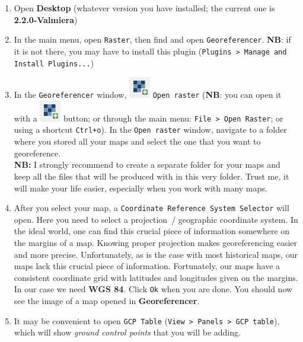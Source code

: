 \documentclass[12pt,oneside]{article}
\begin{document}
\begin{enumerate}

\item Open \QGIS \textbf{Desktop} (whatever version you have installed; the current one is \QGIS \textbf{2.2.0-Valmiera})

\item In the main menu, open \texttt{Raster}, then find and open \texttt{Georeferencer}. \textbf{NB}: if it is not there, you may have to install this plugin (\texttt{Plugins > Manage and Install Plugins...})

\item In the \texttt{Georeferencer} window, \includegraphics[scale=.5]{qgis_g_openraster} \texttt{Open raster} (\textbf{NB}: you can open it with a \includegraphics[scale=.5]{qgis_g_openraster} button; or through the main menu: \texttt{File > Open Raster}; or using a shortcut \texttt{Ctrl+o}). In the \texttt{Open raster} window, navigate to a folder where you stored all your maps and select the one that you want to georeference.\\
\textbf{NB:} I strongly recommend to create a separate folder for your maps and keep all the files that will be produced with \QGIS in this very folder. Trust me, it will make your life easier, especially when you work with many maps.

\item After you select your map, a \texttt{Coordinate Reference System Selector} will open. Here you need to select a projection~/ geographic coordinate system. In the ideal world, one can find this crucial piece of information somewhere on the margins of a map. Knowing proper projection makes georeferencing easier and more precise. Unfortunately, as is the case with most historical maps, our maps lack this crucial piece of information. Fortunately, our maps have a consistent coordinate grid with latitudes and longitudes given on the margins. In our case we need \textbf{WGS 84}. Click \texttt{Ok} when you are done. You should now see the image of a map opened in \textbf{Georeferencer}.

\item It may be convenient to open \texttt{GCP Table} (\texttt{View > Panels > GCP table}), which will show \textit{ground control points} that you will be adding.


\end{enumerate}
\end{document}
